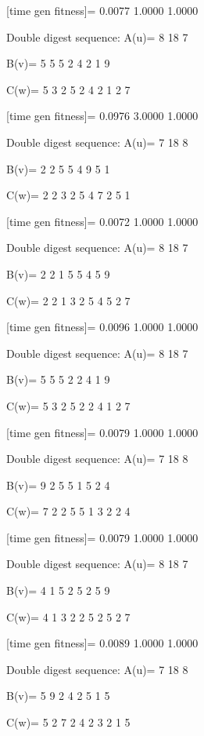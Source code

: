[time gen fitness]=
    0.0077    1.0000    1.0000

Double digest sequence:
A(u)=
     8    18     7

B(v)=
     5     5     5     2     4     2     1     9

C(w)=
     5     3     2     5     2     4     2     1     2     7

[time gen fitness]=
    0.0976    3.0000    1.0000

Double digest sequence:
A(u)=
     7    18     8

B(v)=
     2     2     5     5     4     9     5     1

C(w)=
     2     2     3     2     5     4     7     2     5     1

[time gen fitness]=
    0.0072    1.0000    1.0000

Double digest sequence:
A(u)=
     8    18     7

B(v)=
     2     2     1     5     5     4     5     9

C(w)=
     2     2     1     3     2     5     4     5     2     7

[time gen fitness]=
    0.0096    1.0000    1.0000

Double digest sequence:
A(u)=
     8    18     7

B(v)=
     5     5     5     2     2     4     1     9

C(w)=
     5     3     2     5     2     2     4     1     2     7

[time gen fitness]=
    0.0079    1.0000    1.0000

Double digest sequence:
A(u)=
     7    18     8

B(v)=
     9     2     5     5     1     5     2     4

C(w)=
     7     2     2     5     5     1     3     2     2     4

[time gen fitness]=
    0.0079    1.0000    1.0000

Double digest sequence:
A(u)=
     8    18     7

B(v)=
     4     1     5     2     5     2     5     9

C(w)=
     4     1     3     2     2     5     2     5     2     7

[time gen fitness]=
    0.0089    1.0000    1.0000

Double digest sequence:
A(u)=
     7    18     8

B(v)=
     5     9     2     4     2     5     1     5

C(w)=
     5     2     7     2     4     2     3     2     1     5

